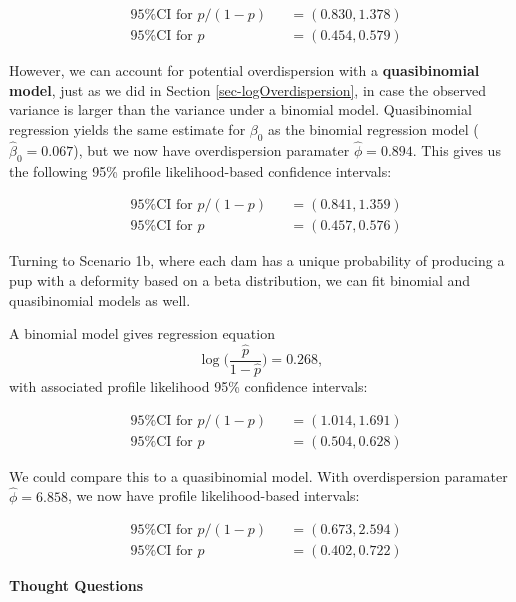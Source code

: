 \documentclass[
]{krantz}
\begin{document}
\[
\begin{alignedat}{2}
  &\textrm{95\% CI for } p/(1-p) &&= (0.830, 1.378) \\
  &\textrm{95\% CI for } p       &&= (0.454, 0.579)
\end{alignedat}
\]

However, we can account for potential overdispersion with a \textbf{quasibinomial model}, just as we did in Section \ref{sec-logOverdispersion}, in case the observed variance is larger than the variance under a binomial model. Quasibinomial regression yields the same estimate for \(\beta_0\) as the binomial regression model (\(\hat{\beta}_0 = 0.067\)), but we now have overdispersion paramater \(\widehat{\phi} = 0.894\). This gives us the following 95\% profile likelihood-based confidence intervals:

\[
\begin{alignedat}{2}
  &\textrm{95\% CI for } p/(1-p) &&= (0.841, 1.359) \\
  &\textrm{95\% CI for } p       &&= (0.457, 0.576)
\end{alignedat}
\]

Turning to Scenario 1b, where each dam has a unique probability of producing a pup with a deformity based on a beta distribution, we can fit binomial and quasibinomial models as well.

A binomial model gives regression equation
\begin{equation}
  \log\bigg(\frac{\hat{p}}{1-\hat{p}}\bigg) = 0.268,
  \label{eq:mod1bBinom}
\end{equation}
with associated profile likelihood 95\% confidence intervals:

\[
\begin{alignedat}{2}
  &\textrm{95\% CI for } p/(1-p) &&= (1.014, 1.691) \\
  &\textrm{95\% CI for } p       &&= (0.504, 0.628)
\end{alignedat}
\]

We could compare this to a quasibinomial model. With overdispersion paramater \(\widehat{\phi} = 6.858\), we now have profile likelihood-based intervals:

\[
\begin{alignedat}{2}
  &\textrm{95\% CI for } p/(1-p) &&= (0.673, 2.594) \\
  &\textrm{95\% CI for } p       &&= (0.402, 0.722)
\end{alignedat}
\]

\textbf{Thought Questions}
\end{document}

